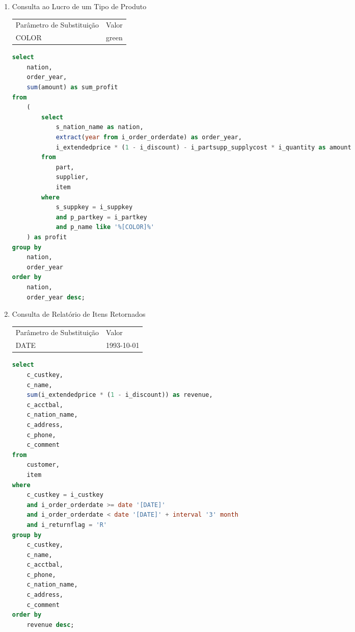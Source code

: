 \begin{enumerate}
	\begin{lstlisting}[language=SQL]
select
	order_year,
	sum(case
		when nation = '[NATION]' then volume
		else 0
	end) / sum(volume) as mkt_share
from
	(
		select
			extract(year from i_order_orderdate) as order_year,
			i_extendedprice * (1 - i_discount) as volume,
			s_nation_name as nation
		from
			part,
			supplier,
			item,
			customer
		where
			p_partkey = i_partkey
			and s_suppkey = i_suppkey
			and i_custkey = c_custkey
			and c_region_name = '[REGION]'
			and i_order_orderdate between date '1995-01-01' and date '1996-12-31'
			and p_type = '[TYPE]'
	) as all_nations
group by
	order_year
order by
	order_year;
	\end{lstlisting}

\item[Q9 --] Consulta ao Lucro de um Tipo de Produto

\begin{tabular}{ll}
	Parâmetro de Substituição & Valor\\
	COLOR & green\\
\end{tabular}

	\begin{lstlisting}[language=SQL]
select
	nation,
	order_year,
	sum(amount) as sum_profit
from
	(
		select
			s_nation_name as nation,
			extract(year from i_order_orderdate) as order_year,
			i_extendedprice * (1 - i_discount) - i_partsupp_supplycost * i_quantity as amount
		from
			part,
			supplier,
			item
		where
			s_suppkey = i_suppkey
			and p_partkey = i_partkey
			and p_name like '%[COLOR]%'
	) as profit
group by
	nation,
	order_year
order by
	nation,
	order_year desc;

\end{lstlisting}

\item[Q10 --] Consulta de Relatório de Itens Retornados

\begin{tabular}{ll}
	Parâmetro de Substituição & Valor\\
	DATE & 1993-10-01\\
\end{tabular}

	\begin{lstlisting}[language=SQL]
select
	c_custkey,
	c_name,
	sum(i_extendedprice * (1 - i_discount)) as revenue,
	c_acctbal,
	c_nation_name,
	c_address,
	c_phone,
	c_comment
from
	customer,
	item
where
	c_custkey = i_custkey
	and i_order_orderdate >= date '[DATE]'
	and i_order_orderdate < date '[DATE]' + interval '3' month
	and i_returnflag = 'R'
group by
	c_custkey,
	c_name,
	c_acctbal,
	c_phone,
	c_nation_name,
	c_address,
	c_comment
order by
	revenue desc;
	

\end{lstlisting}
\end{enumerate}
